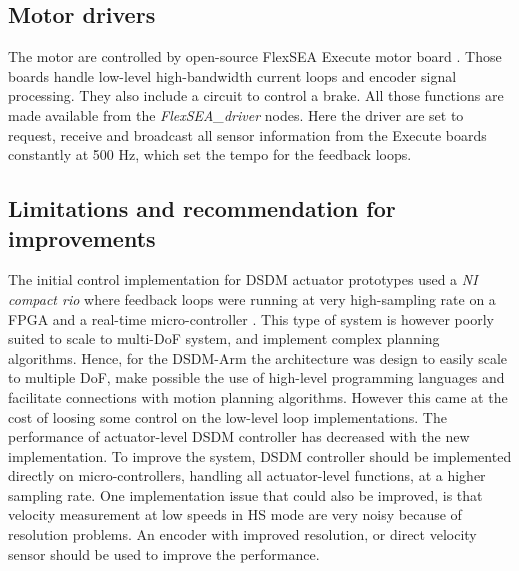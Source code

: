 \subsection{Motor drivers}

The motor are controlled by open-source FlexSEA Execute motor board \cite{duval_flexsea-execute:_2016}. Those boards handle low-level high-bandwidth current loops and encoder signal processing. They also include a circuit to control a brake. All those functions are made available from the \textit{FlexSEA\_driver} nodes. Here the driver are set to request, receive and broadcast all sensor information from the Execute boards constantly at 500 Hz, which set the tempo for the feedback loops. 


\subsection{Limitations and recommendation for improvements} 

The initial control implementation for DSDM actuator prototypes used a \textit{NI compact rio} where feedback loops were running at very high-sampling rate on a FPGA and a real-time micro-controller \cite{girard_two-speed_2015}. This type of system is however poorly suited to scale to multi-DoF system, and implement complex planning algorithms. Hence, for the DSDM-Arm the architecture was design to easily scale to multiple DoF, make possible the use of high-level programming languages and facilitate connections with motion planning algorithms. However this came at the cost of loosing some control on the low-level loop implementations. The performance of actuator-level DSDM controller has decreased with the new implementation. To improve the system, DSDM controller should be implemented directly on micro-controllers, handling all actuator-level functions, at a higher sampling rate. One implementation issue that could also be improved, is that velocity measurement at low speeds in HS mode are very noisy because of resolution problems. An encoder with improved resolution, or direct velocity sensor should be used to improve the performance. 








